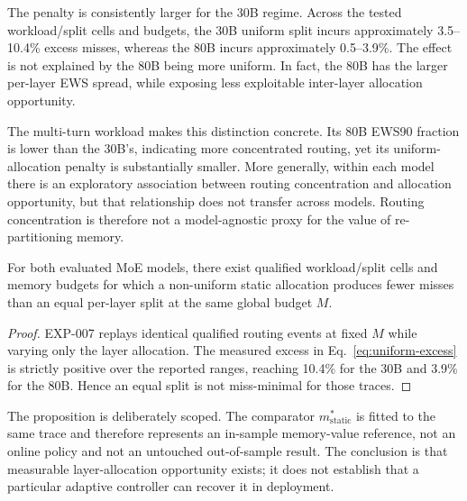 The penalty is consistently larger for the 30B regime. Across the tested workload/split cells and budgets, the 30B uniform split incurs approximately 3.5--10.4\% excess misses, whereas the 80B incurs approximately 0.5--3.9\%. The effect is not explained by the 80B being more uniform. In fact, the 80B has the larger per-layer EWS spread, while exposing less exploitable inter-layer allocation opportunity.

The multi-turn workload makes this distinction concrete. Its 80B EWS90 fraction is lower than the 30B's, indicating more concentrated routing, yet its uniform-allocation penalty is substantially smaller. More generally, within each model there is an exploratory association between routing concentration and allocation opportunity, but that relationship does not transfer across models. Routing concentration is therefore not a model-agnostic proxy for the value of re-partitioning memory.

\begin{proposition}
\label{prop:uniform-suboptimal}
For both evaluated MoE models, there exist qualified workload/split cells and memory budgets for which a non-uniform static allocation produces fewer misses than an equal per-layer split at the same global budget $M$.
\end{proposition}

\begin{proof}
EXP-007 replays identical qualified routing events at fixed $M$ while varying only the layer allocation. The measured excess in Eq.~\eqref{eq:uniform-excess} is strictly positive over the reported ranges, reaching 10.4\% for the 30B and 3.9\% for the 80B. Hence an equal split is not miss-minimal for those traces.
\end{proof}

The proposition is deliberately scoped. The comparator $m_{\mathrm{static}}^{*}$ is fitted to the same trace and therefore represents an in-sample memory-value reference, not an online policy and not an untouched out-of-sample result. The conclusion is that measurable layer-allocation opportunity exists; it does not establish that a particular adaptive controller can recover it in deployment.
